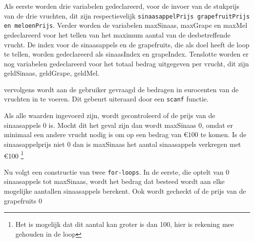 Als eerste worden drie variabelen gedeclareerd, voor de invoer van de stukprijs van de drie vruchten, dit zijn respectievelijk {\tt sinaasappelPrijs grapefruitPrijs en meloenPrijs}.
Verder worden de variabelen maxSinaas, maxGrape en maxMel gedeclareerd voor het tellen van het maximum aantal van de desbetreffende vrucht.
De index voor de sinaasappels en de grapefruits, die als doel heeft de loop te tellen, worden gedeclareerd als sinaasIndex en grapeIndex.
Tenslotte worden er nog variabelen gedeclareerd voor het totaal bedrag uitgegeven per vrucht, dit zijn geldSinaas, geldGrape, geldMel.

vervolgens wordt aan de gebruiker gevraagd de bedragen in eurocenten van de vruchten  in te voeren.
Dit gebeurt uiteraard door een {\tt scanf} functie.

Als alle waarden ingevoerd zijn, wordt gecontroleerd of de prijs van de sinaasappels 0 is.
Mocht dit het geval zijn dan wordt maxSinaas 0, omdat er minimaal een andere vrucht nodig is om op een bedrag van \euro100 te komen.
Is de sinaasappelprijs niet 0 dan is maxSinaas het aantal sinaasappels verkregen met \euro100 \footnote{Het is mogelijk dat dit aantal kan groter is dan 100, hier is rekening mee gehouden in de loop}

Nu volgt een constructie van twee {\tt for-loops}.
In de eerste, die optelt van 0 sinaasappels tot maxSinaas, wordt het bedrag dat besteed wordt aan elke mogelijke aantallen sinaasappels berekent.
Ook wordt gecheckt of de prijs van de grapefruits 0  

